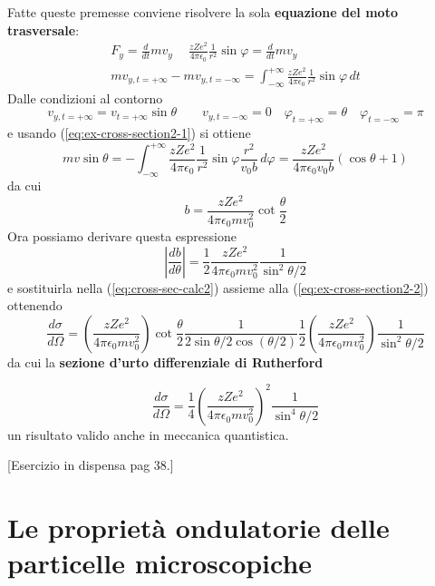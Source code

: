 Fatte queste premesse conviene risolvere la sola \textbf{equazione del moto trasversale}:
\begin{gather*}
	F_y = \frac{d}{dt}m v_y \quad \ \frac{zZe^2}{4 \pi \epsilon_0}\frac{1}{r^2}\sin \varphi = \frac{d}{dt}mv_y\\
	mv_{y,t= + \infty} - mv_{y,t = - \infty} = \int_{- \infty}^{+\infty} \frac{zZe^2}{4 \pi \epsilon_0}\frac{1}{r^2}\sin \varphi\,dt
\end{gather*}
Dalle condizioni al contorno
\[
	v_{y,t= + \infty} = v_{t= + \infty}\sin \theta \qquad v_{y,t = - \infty} = 0 \quad \varphi_{t = +\infty} = \theta \quad \varphi_{t = - \infty} = \pi
\]
e usando (\ref{eq:ex-cross-section2-1}) si ottiene
\[
	mv \sin \theta = - \int_{- \infty}^{+ \infty} \frac{zZe^2}{4 \pi \epsilon_0}\frac{1}{r^2}\sin \varphi
	\frac{r^2}{v_0b}\,d \varphi = \frac{zZe^2}{4 \pi \epsilon_0 v_0 b}(\cos \theta + 1)
\]
da cui
\begin{equation}
	b = \frac{zZe^2}{4 \pi \epsilon_0 m v^2_0} \cot \frac{\theta}{2}
	\label{eq:ex-cross-section2-3}
\end{equation}
Ora possiamo derivare questa espressione
\[
	\left | \frac{db}{d \theta}\right | = \frac{1}{2}\frac{zZe^2}{4 \pi \epsilon_0 m v^2_0}\frac{1}{\sin^2{\theta/2}}
\]
e sostituirla nella (\ref{eq:cross-sec-calc2}) assieme alla (\ref{eq:ex-cross-section2-2}) ottenendo
\[
	\frac{d \sigma }{d \Omega} = \left( \frac{zZe^2}{4 \pi \epsilon_0m v^2_0}\right) \cot{\frac{\theta}{2}}\frac{1}{2 \sin{\theta / 2 \cos (\theta /2)}}\frac{1}{2}\left( \frac{zZe^2}{4 \pi \epsilon_0m v^2_0}\right)\frac{1}{\sin^2{\theta/2}}
\]
da cui la \textbf{sezione d'urto differenziale di Rutherford}

\begin{equation}
	\frac{d \sigma }{d \Omega} = \frac{1}{4} \left( \frac{zZe^2}{4 \pi \epsilon_0m v^2_0}\right) ^2\frac{1}{\sin^4{\theta / 2}}
\end{equation}
un risultato valido anche in meccanica quantistica.

[Esercizio in dispensa pag 38.]

\section{Le proprietà ondulatorie delle particelle microscopiche}\label{sec:proprieta-ondulatorie-delle-particelle-microscopiche}

